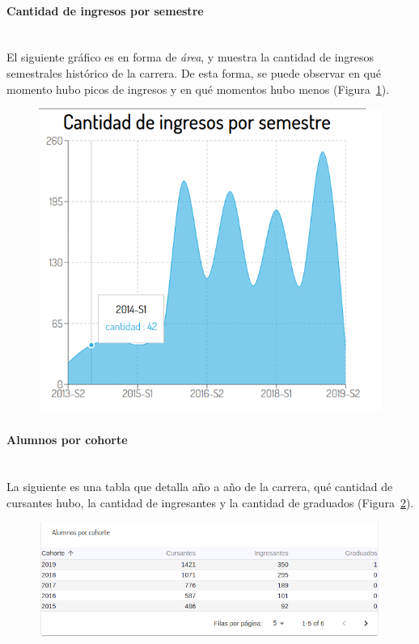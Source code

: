 \paragraph{Cantidad de ingresos por semestre} \mbox{}\\
El siguiente gráfico es en forma de \textit{área}, y muestra la cantidad de ingresos semestrales histórico de la carrera. De esta forma, se puede observar en qué momento hubo picos de ingresos y en qué momentos hubo menos (Figura~\ref{fig:sa-ingresos-semestre}).

\begin{figure}[H]
  \centering
    \includegraphics[scale=0.4]{images/seguimiento-academico/sa-ingresossemestre.png}
  \label{fig:sa-ingresos-semestre}
\end{figure}

\paragraph{Alumnos por cohorte} \mbox{}\\
La siguiente es una tabla que detalla año a año de la carrera, qué cantidad de cursantes hubo, la cantidad de ingresantes y la cantidad de graduados  (Figura~\ref{fig:sa-alumnos-cohorte}).

\begin{figure}[H]
  \centering
    \includegraphics[scale=0.4]{images/seguimiento-academico/sa-alumnos-cohorte.png}
  \label{fig:sa-alumnos-cohorte}
\end{figure}

